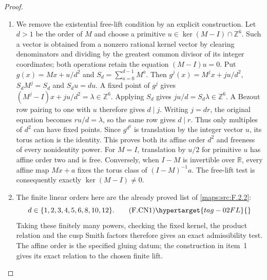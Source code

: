 \begin{proof}
\begin{enumerate}[label={$\langle1\rangle$\arabic*.}]
\item We remove the existential free-lift condition by an explicit
construction. Let $d>1$ be the order of $M$ and choose a primitive
$u\in\ker(M-I)\cap\mathbb Z^6$. Such a vector is obtained from a
nonzero rational kernel vector by clearing denominators and dividing
by the greatest common divisor of its integer coordinates; both
operations retain the equation $(M-I)u=0$. Put
$g(x)=Mx+u/d^2$ and $S_d=\sum_{a=0}^{d-1}M^a$.
Then $g^j(x)=M^jx+ju/d^2$, $S_dM^j=S_d$ and $S_du=du$.
A fixed point of $g^j$ gives
$(M^j-I)x+ju/d^2=\lambda\in\mathbb Z^6$.
Applying $S_d$ gives $ju/d=S_d\lambda\in\mathbb Z^6$.
A Bezout row pairing to one with $u$ therefore gives $d\mid j$.
Writing $j=dr$, the original equation becomes $ru/d=\lambda$,
so the same row gives $d\mid r$. Thus only multiples of $d^2$
can have fixed points. Since $g^{d^2}$ is translation by the
integer vector $u$, its torus action is the identity. This proves
both its affine order $d^2$ and freeness of every nonidentity power.
For $M=I$, translation by $u/2$ for primitive $u$ has affine order
two and is free. Conversely, when $I-M$ is invertible over
$\mathbb R$, every affine map $Mx+a$ fixes the torus class of
$(I-M)^{-1}a$. The free-lift test is consequently exactly
$\ker(M-I)\ne0$.

\item The finite linear orders here are the already proved list of
\cref{maps:src:F.2.2}:
\[
 d\in\{1,2,3,4,5,6,8,10,12\}.
 \tag{F.CN1}\hypertarget{tag-02FL}{}\label{maps:eq:F.CN1}
\]
Taking these finitely many powers, checking the fixed kernel,
the product relation and the cusp Smith factors therefore gives
an exact admissibility test. The affine order is the
specified gluing datum; the construction in item~1 gives
its exact relation to the chosen finite lift.


\end{enumerate}
\end{proof}
